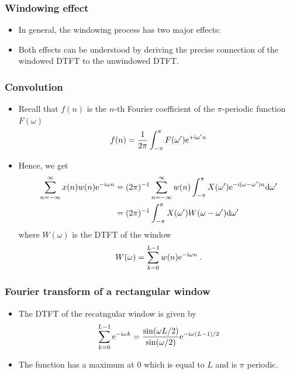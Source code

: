 \begin{frame}
\frametitle{Windowing effect}
\begin{itemize}
\item In general, the windowing process has two major effects: 
\item Both effects can be understood by deriving the precise connection of the windowed DTFT  to the unwindowed DTFT.
\end{itemize}
\end{frame}

\begin{frame}
\frametitle{Convolution}
\begin{itemize}
\item Recall that $f(n)$ is the $n$-th Fourier coefficient of the $\pi$-periodic function $F(\omega)$
\[
f(n) = \frac{1}{2 \pi} \int_{-\pi}^{\pi} F(\omega') \mathrm{e}^{+ \mathrm{i} \omega' n} 
\]
\item Hence, we get 
\begin{align*}
\sum_{n=-\infty}^{\infty} x(n) w(n) \mathrm{e}^{-\mathrm{i} \omega n} &= (2 \pi)^{-1} \sum_{n=-\infty}^{\infty} w(n) \int_{-\pi}^{\pi} X(\omega') \mathrm{e}^{-\mathrm{i} (\omega-\omega') n} \mathrm{d} \omega' \\
&= (2\pi)^{-1} \int_{-\pi}^\pi X(\omega') W(\omega - \omega') \mathrm{d} \omega'
\end{align*}
where $W(\omega)$ is the DTFT of the window
\[
W(\omega)= \sum_{k=0}^{L-1} w(n) \mathrm{e}^{-\mathrm{i} \omega n} \;.
\]
\end{itemize}
\end{frame}

\begin{frame}
\frametitle{Fourier transform of a rectangular window}
\begin{itemize}
\item The DTFT of the recatngular window is given by 
\[
\sum_{k=0}^{L-1} \mathrm{e}^{-\mathrm{i} \omega k}= \frac{\sin(\omega L/2)}{\sin(\omega/2)} \mathrm{e}^{- \mathrm{i} \omega (L-1)/2}
\]
\item The function has a maximum at $0$ which is equal to $L$ and is $\pi$ periodic.
\end{itemize}
\end{frame}

